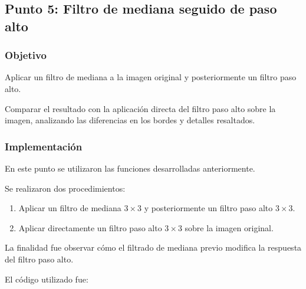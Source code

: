 \documentclass[11pt,letterpaper]{article}
\begin{document}
\subsection{Punto 5: Filtro de mediana seguido de paso alto}

\subsubsection*{Objetivo}

Aplicar un filtro de mediana a la imagen
original y posteriormente un filtro paso alto.

Comparar el resultado con la aplicación
directa del filtro paso alto sobre la imagen,
analizando las diferencias en los bordes
y detalles resaltados.

\subsubsection*{Implementación}

En este punto se utilizaron las funciones
desarrolladas anteriormente.

Se realizaron dos procedimientos:

\begin{enumerate}

    \item Aplicar un filtro de mediana
    $3\times3$ y posteriormente un filtro
    paso alto $3\times3$.

    \item Aplicar directamente un filtro
    paso alto $3\times3$ sobre la imagen
    original.

\end{enumerate}

La finalidad fue observar cómo
el filtrado de mediana previo modifica
la respuesta del filtro paso alto.

El código utilizado fue:
\end{document}
